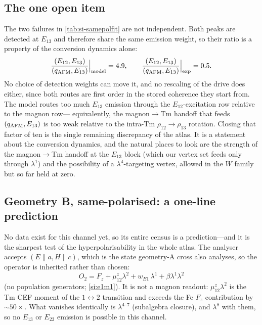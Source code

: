 \documentclass[11pt]{article}
\newcommand{\qafm}{q_{\rm AFM}}
\begin{document}
\subsection{The one open item}
\label{si:openitem2}

The two failures in \cref{tab:si-samepolfit} are not independent.  Both
peaks are detected at $E_{13}$ and therefore share the same emission
weight, so their ratio is a property of the conversion dynamics alone:
\begin{equation}
  \frac{(E_{12},E_{13})}{(\qafm,E_{13})}\Big|_{\rm model}=4.9 ,
  \qquad
  \frac{(E_{12},E_{13})}{(\qafm,E_{13})}\Big|_{\rm exp}=0.5 .
  \label{eq:si-gap}
\end{equation}
No choice of detection weights can move it, and no rescaling of the
drive does either, since both routes are first order in the stored
coherence they start from.  The model routes too much $E_{13}$ emission
through the $E_{12}$-excitation row relative to the magnon row---%
equivalently, the magnon$\to$Tm handoff that feeds $(\qafm,E_{13})$ is
too weak relative to the intra-Tm $\rho_{12}\to\rho_{13}$ rotation.
Closing that factor of ten is the single remaining discrepancy of the
atlas.  It is a statement about the conversion dynamics, and the natural
places to look are the strength of the magnon$\to$Tm handoff at the
$E_{13}$ block (which our vertex set feeds only through $\lambda^1$) and
the possibility of a $\lambda^4$-targeting vertex, allowed in the $W$
family but so far held at zero.

\subsection{Geometry B, same-polarised: a one-line prediction}
\label{si:peaksBsame}

No data exist for this channel yet, so its entire census is a
prediction---and it is the sharpest test of the hyperpolarisability in
the whole atlas.  The analyser accepts $(E\!\parallel\!a,
H\!\parallel\!c)$, which is the state geometry-A cross also analyses, so
the operator is inherited rather than chosen:
\begin{equation}
  O_{2}=F_z+\mu^z_{12}\lambda^2
       +w_{E1}\,\lambda^1
       +\beta\lambda^1\lambda^2
  \label{eq:si-O2}
\end{equation}
(no population generators; \cref{si:e1m1}).  It is not a magnon
readout: $\mu^z_{12}\lambda^2$ is the Tm CEF moment of the
$1\!\leftrightarrow\!2$ transition and exceeds the Fe $F_z$
contribution by $\sim\!50\times$.  What vanishes identically is
$\lambda^{4\text{--}7}$ (subalgebra closure), and $\lambda^8$ with
them, so no $E_{13}$ or $E_{23}$ emission is possible in this channel.
\end{document}
